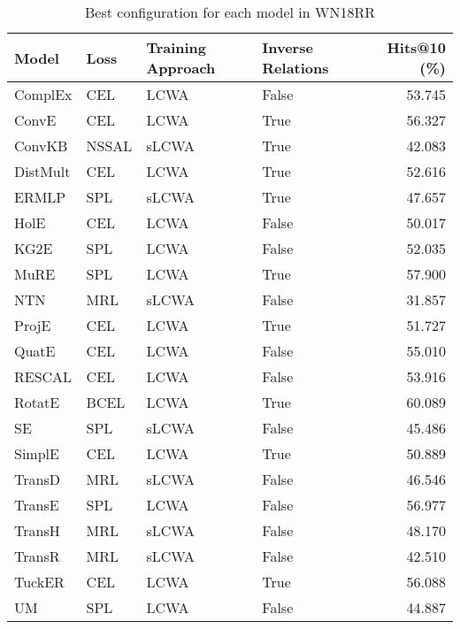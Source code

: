 \begin{table}
\centering
\caption{Best configuration for each model in WN18RR}
\label{best_models_wn18rr}
\begin{tabular}{llllr}
\toprule
   Model &  Loss & Training Approach & Inverse Relations &  Hits@10 (\%) \\
\midrule
 ComplEx &   CEL &              LCWA &             False &       53.745 \\
   ConvE &   CEL &              LCWA &              True &       56.327 \\
  ConvKB & NSSAL &             sLCWA &              True &       42.083 \\
DistMult &   CEL &              LCWA &              True &       52.616 \\
   ERMLP &   SPL &             sLCWA &              True &       47.657 \\
    HolE &   CEL &              LCWA &             False &       50.017 \\
    KG2E &   SPL &              LCWA &             False &       52.035 \\
    MuRE &   SPL &              LCWA &              True &       57.900 \\
     NTN &   MRL &             sLCWA &             False &       31.857 \\
   ProjE &   CEL &              LCWA &              True &       51.727 \\
   QuatE &   CEL &              LCWA &             False &       55.010 \\
  RESCAL &   CEL &              LCWA &             False &       53.916 \\
  RotatE &  BCEL &              LCWA &              True &       60.089 \\
      SE &   SPL &             sLCWA &             False &       45.486 \\
  SimplE &   CEL &              LCWA &              True &       50.889 \\
  TransD &   MRL &             sLCWA &             False &       46.546 \\
  TransE &   SPL &              LCWA &             False &       56.977 \\
  TransH &   MRL &             sLCWA &             False &       48.170 \\
  TransR &   MRL &             sLCWA &             False &       42.510 \\
  TuckER &   CEL &              LCWA &              True &       56.088 \\
      UM &   SPL &              LCWA &             False &       44.887 \\
\bottomrule
\end{tabular}
\end{table}

